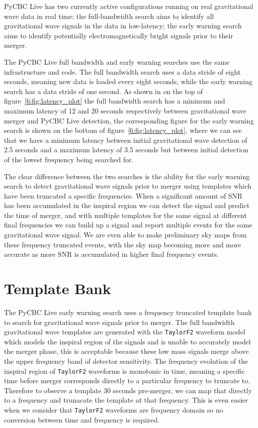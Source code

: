 PyCBC Live has two currently active configurations running on real gravitational wave data in real time: the full-bandwidth search aims to identify all gravitational wave signals in the data in low-latency; the early warning search aims to identify potentially electromagnetically bright signals prior to their merger.

The PyCBC Live full bandwidth and early warning searches use the same infrastructure and code. The full bandwidth search uses a data stride of eight seconds, meaning new data is loaded every eight seconds, while the early warning search has a data stride of one second. As shown in on the top of figure~\ref{6:fig:latency_plot} the full bandwidth search has a minimum and maximum latency of 12 and 20 seconds respectively between gravitational wave merger and PyCBC Live detection, the corresponding figure for the early warning search is shown on the bottom of figure~\ref{6:fig:latency_plot}, where we can see that we have a minimum latency between initial gravitational wave detection of 2.5 seconds and a maximum latency of 3.5 seconds but between initial detection of the lowest frequency being searched for.

The clear difference between the two searches is the ability for the early warning search to detect gravitational wave signals prior to merger using templates which have been truncated a specific frequencies. When a significant amount of SNR has been accumulated in the inspiral region we can detect the signal and predict the time of merger, and with multiple templates for the same signal at different final frequencies we can build up a signal and report multiple events for the same gravitational wave signal. We are even able to make preliminary sky maps from these frequency truncated events, with the sky map becoming more and more accurate as more SNR is accumulated in higher final frequency events.

\section{Template Bank}

The PyCBC Live early warning search uses a frequency truncated template bank to search for gravitational wave signals prior to merger. The full bandwidth gravitational wave templates are generated with the \verb|TaylorF2| waveform model which models the inspiral region of the signals and is unable to accurately model the merger phase, this is acceptable because these low mass signals merge above the upper frequency band of detector sensitivity. The frequency evolution of the inspiral region of \verb|TaylorF2| waveforms is monotonic in time, meaning a specific time before merger corresponds directly to a particular frequency to truncate to. Therefore to observe a template $30$ seconds pre-merger, we can map that directly to a frequency and trunacate the template at that frequency. This is even easier when we consider that \verb|TaylorF2| waveforms are frequency domain so no conversion between time and frequency is required.

